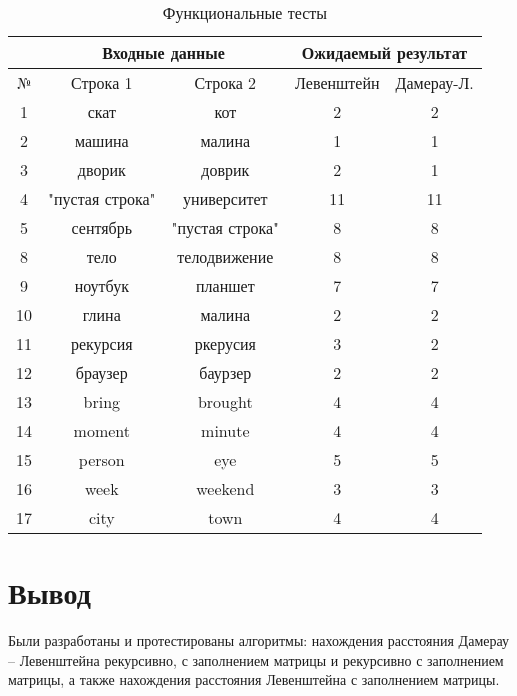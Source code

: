 \begin{table}[h]
	\begin{center}
		\caption{\label{tabular:functional_test} Функциональные тесты}
		\begin{tabular}{|c|c|c|c|c|}
			\hline
			& \multicolumn{2}{c|}{Входные данные} & \multicolumn{2}{c|}{Ожидаемый результат} \\
			\hline
			№&Строка 1&Строка 2&Левенштейн&Дамерау-Л. \\
			\hline
			1&скат&кот&2&2 \\
			\hline
			2&машина&малина&1&1 \\
			\hline
			3&дворик&доврик&2&1 \\
			\hline
			4&"пустая строка"&университет&11&11 \\
			\hline
			5&сентябрь&"пустая строка"&8&8 \\
			\hline
			8&тело&телодвижение&8&8 \\
			\hline
			9&ноутбук&планшет&7&7 \\
			\hline
			10&глина&малина&2&2 \\
			\hline
			11&рекурсия&ркерусия&3&2 \\
			\hline
			12&браузер&баурзер&2&2 \\
			\hline
			13&bring&brought&4&4 \\
			\hline
			14&moment&minute&4&4 \\ 
			\hline
			15&person&eye&5&5 \\
			\hline
			16&week&weekend&3&3 \\
			\hline 
			17&city&town&4&4 \\
			\hline
		\end{tabular}
	\end{center}
\end{table}


\section*{Вывод}

Были разработаны и протестированы алгоритмы: нахождения расстояния Дамерау -- Левенштейна рекурсивно, с заполнением матрицы и рекурсивно с заполнением матрицы, а также нахождения расстояния Левенштейна с заполнением матрицы.
